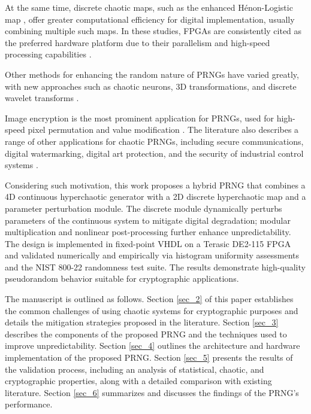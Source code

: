 \documentclass[preprint,12pt]{elsarticle}
\begin{document}
At the same time, discrete chaotic maps, such as the enhanced Hénon-Logistic map \cite{hussein_new_2018}, offer greater computational efficiency for digital implementation, usually combining multiple such maps. In these studies, FPGAs are consistently cited as the preferred hardware platform due to their parallelism and high-speed processing capabilities \cite{dridi_design_2023}.

Other methods for enhancing the random nature of PRNGs have varied greatly, with new approaches such as chaotic neurons, 3D transformations, and discrete wavelet transforms \cite{tlelo-cuautle_chaotic_2020, zhang_color_2022, kaibou_real-time_2021}.


Image encryption is the most prominent application for PRNGs, used for high-speed pixel permutation and value modification \cite{el-latif_novel_2022,gafsi_improved_2020,ayad_robust_2024}.
The literature also describes a range of other applications for chaotic PRNGs, including secure communications, digital watermarking, digital art protection, and the security of industrial control systems \cite{kaibou_real-time_2021, hobincu_fpga_2018,  shi_chaos-based_2024, perez-resa_chaotic_2019}. 

Considering such motivation, this work proposes a hybrid PRNG that combines a 4D continuous hyperchaotic generator with a 2D discrete hyperchaotic map and a parameter perturbation module. The discrete module dynamically perturbs parameters of the continuous system to mitigate digital degradation; modular multiplication and nonlinear post-processing further enhance unpredictability. The design is implemented in fixed-point VHDL on a Terasic DE2-115 FPGA and validated numerically and empirically via histogram uniformity assessments and the NIST 800-22 randomness test suite. The results demonstrate high-quality pseudorandom behavior suitable for cryptographic applications.

The manuscript is outlined as follows. Section \ref{sec_2} of this paper establishes the common challenges of using chaotic systems for cryptographic purposes and details the mitigation strategies proposed in the literature. Section \ref{sec_3} describes the components of the proposed PRNG and the techniques used to improve unpredictability. Section \ref{sec_4} outlines the architecture and hardware implementation of the proposed PRNG. Section \ref{sec_5} presents the results of the validation process, including an analysis of statistical, chaotic, and cryptographic properties, along with a detailed comparison with existing literature. Section \ref{sec_6} summarizes and discusses the findings of the PRNG's performance.
\end{document}
